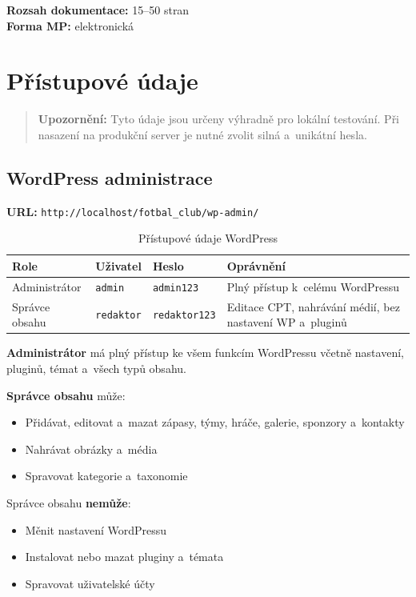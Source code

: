 \documentclass[12pt,a4paper]{article}
\begin{document}
\textbf{Rozsah dokumentace:} 15--50 stran\\
\textbf{Forma MP:} elektronická

\section{Přístupové údaje}

\begin{quote}
\textbf{Upozornění:} Tyto údaje jsou určeny výhradně pro lokální testování. Při nasazení na produkční server je nutné zvolit silná a~unikátní hesla.
\end{quote}

\subsection*{WordPress administrace}

\textbf{URL:} \texttt{http://localhost/fotbal\_club/wp-admin/}

\begin{table}[H]
\centering
\small
\begin{tabularx}{\textwidth}{l l l X}
\toprule
\textbf{Role} & \textbf{Uživatel} & \textbf{Heslo} & \textbf{Oprávnění} \\
\midrule
Administrátor & \texttt{admin} & \texttt{admin123} & Plný přístup k~celému WordPressu \\
Správce obsahu & \texttt{redaktor} & \texttt{redaktor123} & Editace CPT, nahrávání médií, bez nastavení WP a~pluginů \\
\bottomrule
\end{tabularx}
\caption{Přístupové údaje WordPress}
\end{table}

\textbf{Administrátor} má plný přístup ke všem funkcím WordPressu včetně nastavení, pluginů, témat a~všech typů obsahu.

\textbf{Správce obsahu} může:
\begin{itemize}
    \item Přidávat, editovat a~mazat zápasy, týmy, hráče, galerie, sponzory a~kontakty
    \item Nahrávat obrázky a~média
    \item Spravovat kategorie a~taxonomie
\end{itemize}

Správce obsahu \textbf{nemůže}:
\begin{itemize}
    \item Měnit nastavení WordPressu
    \item Instalovat nebo mazat pluginy a~témata
    \item Spravovat uživatelské účty
\end{itemize}
\end{document}
